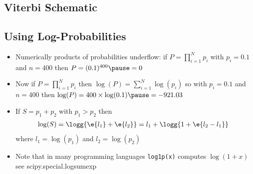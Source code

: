 
\begin{slide}
\section{Viterbi Schematic}
\pb \pause {}

\begin{center}
   \pause
\end{center}

\end{slide}


\begin{slide}
\section[-2]{Using Log-Probabilities}

\begin{PauseHighLight}
  \begin{itemize}
  \item Numerically products of probabilities underflow\pause:
    if $P = \prod\limits_{i=1}^N p_i$ with $p_i=0.1$ and $n=400$ then $P=(0.1)^{400}\pause=0$\pauseb
  \item Now if $P = \prod\limits_{i=1}^N p_i$ then $\log(P)
    = \sum\limits_{i=1}^N \log(p_i)$\pause{} so with $p_i=0.1$ and $n=400$ then
    $\log(P)=400\times\log(0.1)\pause=-921.03$\pauseb
  \item If $S = p_1 + p_2$ with $p_1>p_2$ then
    \begin{align*}
      \log(S) = \logg{\e{l_1}+\e{l_2}} = l_1 + \logg{1+\e{l_2-l_1}}
    \end{align*}
    where $l_1=\log(p_1)$ and $l_2=\log(p_2)$\pause
  \item Note that in many programming languages  \texttt{log1p(x)}
    computes $\log(1+x)$\pause{} see scipy.special.logsumexp\pauseb
  \end{itemize}
\end{PauseHighLight}

\end{slide}




